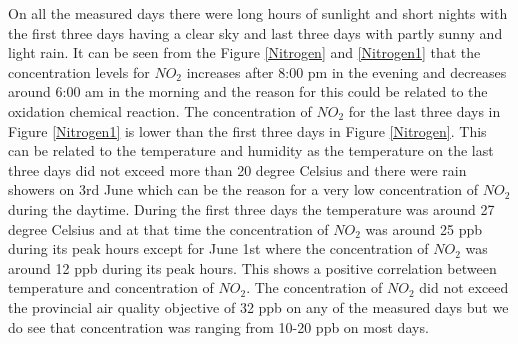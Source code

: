 On all the measured days there were long hours of sunlight and short nights with the first three days having a clear sky and last three days with partly sunny and light rain. It can be seen from the Figure \ref{Nitrogen} and \ref{Nitrogen1} that the concentration levels for ${NO_2}$ increases after 8:00 pm in the evening and decreases around 6:00 am in the morning and the reason for this could be related to the oxidation chemical reaction. The concentration of ${NO_2}$ for the last three days in Figure \ref{Nitrogen1} is lower than the first three days in Figure  \ref{Nitrogen}. This can be related to the temperature and humidity as the temperature on the last three days did not exceed more than 20 degree Celsius and there were rain showers on 3rd June which can be the reason for a very low concentration of ${NO_2}$ during the daytime. During the first three days the temperature was around 27 degree Celsius and at that time the concentration of ${NO_2}$ was around 25 ppb during its peak hours except for June 1st where the concentration of ${NO_2}$ was around 12 ppb during its peak hours. This shows a positive correlation between temperature and concentration of ${NO_2}$. The concentration of ${NO_2}$ did not exceed the provincial air quality objective of 32 ppb on any of the measured days but we do see that concentration  was ranging from 10-20 ppb on most days.

